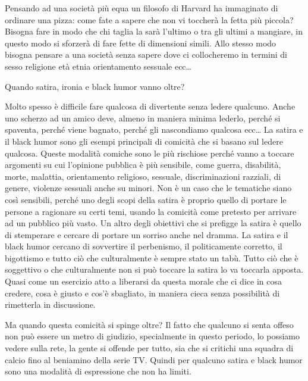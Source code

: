 \documentclass[12pt]{book} %
\begin{document}
\bigskip

Pensando ad una società più equa un filosofo di Harvard ha immaginato di ordinare una pizza: come fate a sapere che non
vi toccherà la fetta più piccola? Bisogna fare in modo che chi taglia la sarà l'ultimo o tra gli ultimi a mangiare, in
questo modo si sforzerà di fare fette di dimensioni simili. Allo stesso modo bisogna pensare a una società senza sapere
dove ci collocheremo in termini di sesso religione età etnia orientamento sessuale ecc… 


\bigskip
\begin{mdframed}[linewidth=1pt]
Quando satira, ironia e black humor vanno oltre?

Molto spesso è difficile fare qualcosa di divertente senza ledere qualcuno. Anche uno scherzo ad un amico deve, almeno
in maniera minima lederlo, perché si spaventa, perché viene bagnato, perché gli nascondiamo qualcosa ecc… La satira e
il black humor sono gli esempi principali di comicità che si basano sul ledere qualcosa. Queste modalità comiche sono
le più rischiose perché vanno a toccare argomenti su cui l'opinione pubblica è più sensibile, come
guerra, disabilità, morte, malattia, orientamento religioso, sessuale, discriminazioni razziali, di genere, violenze
sessuali anche su minori. Non è un caso che le tematiche siano così sensibili, perché uno degli scopi della satira è
proprio quello di portare le persone a ragionare su certi temi, usando la comicità come pretesto per arrivare ad un
pubblico più vasto. Un altro degli obiettivi che si prefigge la satira è quello di stemperare e cercare di portare un
sorriso anche nel dramma. La satira e il black humor cercano di sovvertire il perbenismo, il politicamente corretto, il
bigottismo e tutto ciò che culturalmente è sempre stato un tabù. Tutto ciò che è soggettivo o che culturalmente non si
può toccare la satira lo va toccarla apposta. Quasi come un esercizio atto a liberarsi da questa morale che ci dice in
cosa credere, cosa è giusto e cos'è sbagliato, in maniera cieca senza possibilità di rimetterla in
discussione. 

Ma quando questa comicità si spinge oltre? Il fatto che qualcuno si senta offeso non può essere un metro di giudizio,
specialmente in questo periodo, lo possiamo vedere sulla rete, la gente si offende per tutto, sia che si critichi una
squadra di calcio fino al beniamino della serie TV. Quindi per qualcuno satira e black humor sono una modalità di
espressione che non ha limiti.


\end{mdframed}
\end{document}
